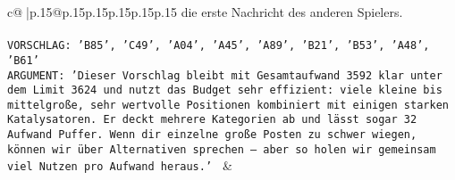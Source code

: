 \documentclass{article}
\begin{document}
{\begin{supertabular}{c@{$\;$}|p{.15\linewidth}@{}p{.15\linewidth}p{.15\linewidth}p{.15\linewidth}p{.15\linewidth}p{.15\linewidth}}
{{{die erste Nachricht des anderen Spielers.\\ \tt \\ \tt VORSCHLAG: {'B85', 'C49', 'A04', 'A45', 'A89', 'B21', 'B53', 'A48', 'B61'}\\ \tt ARGUMENT: {'Dieser Vorschlag bleibt mit Gesamtaufwand 3592 klar unter dem Limit 3624 und nutzt das Budget sehr effizient: viele kleine bis mittelgroße, sehr wertvolle Positionen kombiniert mit einigen starken Katalysatoren. Er deckt mehrere Kategorien ab und lässt sogar 32 Aufwand Puffer. Wenn dir einzelne große Posten zu schwer wiegen, können wir über Alternativen sprechen – aber so holen wir gemeinsam viel Nutzen pro Aufwand heraus.'} 
	  } 
	   } 
	   } 
	 & \\ 
 

    \theutterance {}  


\end{supertabular}}
\end{document}
